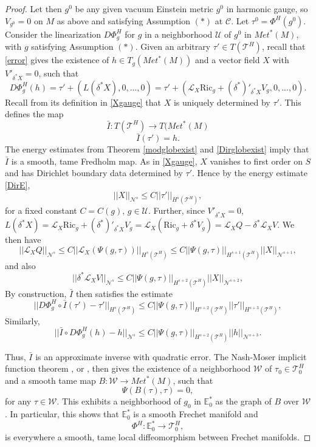 \documentclass[10pt]{amsart}
\renewcommand{\d}{\delta}
\newcommand{\cC}{{\mathcal C}}
\newcommand{\cT}{{\mathcal T}}
\newcommand{\cL}{{\mathcal L}}
\newcommand{\cU}{{\mathcal U}}
\newcommand{\cN}{{\mathcal N}}
\newcommand{\cW}{\mathcal W}
\newcommand{\bE}{\mathbb E}
\newcommand{\Ric}{\mathrm{Ric}}
\newcommand{\be}{\begin{equation}}
\newcommand{\ee}{\end{equation}}
\renewcommand{\to}{\rightarrow}
\newcommand{\<}{\langle}
\renewcommand{\>}{\rangle}
\theoremstyle{plain}
\theoremstyle{remark}
\theoremstyle{definition}
\numberwithin{equation}{section}
\begin{document}
\begin{proof}
    Let then $g^0$ be any given vacuum Einstein metric $g^0$ in harmonic gauge, so $V_{g^0} = 0$ on $M$ as above and satisfying Assumption $(*)$ at $\cC$. Let 
 $\tau^0 = \Phi^H(g^0)$. Consider the linearization $D\Phi_g^H$ for $g$ in a neighborhood $\cU$ of $g^0$ in $Met^*(M)$, with $g$ satisfying Assumption $(*)$. 
 Given an arbitrary $\tau' \in T(\cT^H)$, recall that \eqref{error} gives the existence of $h \in T_g(Met^*(M))$ and a vector field $X$ with $V'_{\d^*X} = 0$, such that 
\be\label{error2}
D\Phi_g^H(h) = \tau' +(L(\d^* X), 0,...,0) = \tau' +(\cL_X \Ric_g+(\d^*)'_{\d^* X}V_g, 0,...,0).
\ee
Recall from its definition in \eqref{Xgauge} that $X$ is uniquely determined by $\tau'$. This defines the map 
$$\bar I:T(\cT^H) \to T(Met^*(M)$$
$$\bar I(\tau') = h.$$
The energy estimates from Theorem \ref{modglobexist} and \ref{Dirglobexist} imply that $\bar I$ is a smooth, tame Fredholm map. As in \eqref{Xgauge}, 
$X$ vanishes to first order on $S$ and has Dirichlet boundary data determined by $\tau'$. Hence by the energy estimate \eqref{DirE},  
\be \label{Xbnd}
||X||_{\cN^s} \leq C ||\tau'||_{H^s(\cT^H)},
\ee
for a fixed constant $C = C(g)$, $g \in \cU$. Further, since $V'_{\d^*X} = 0$, $L(\d^*X) = \cL_X \Ric_g+(\d^*)'_{\d^* X}V_g = \cL_X(\Ric_g + \d^*V_g) = 
\cL_X Q - \d^*\cL_X V$. We then have  
$$||\cL_X Q||_{\cN^s} \leq C||\cL_X(\Psi(g, \tau))||_{H^s(\cT^H)} \leq C||\Psi(g, \tau)||_{H^{s+1}(\cT^H)} ||X||_{\cN^{s+1}},$$
and also
$$||\d^* \cL_X V||_{\cN^s}  \leq C||\Psi(g, \tau)||_{H^{s+2}(\cT^H)} ||X||_{\cN^{s+2}},$$
By construction, $\bar I$ then satisfies the estimate   
\be \label{quaderror}
||D\Phi_g^H\circ \bar I(\tau')-\tau'||_{H^s(\cT^H)} \leq C||\Psi(g, \tau)||_{H^{s+2}(\cT^H)} ||\tau'||_{H^{s+3}(\cT^H)},
\ee
Similarly, 
$$||\bar I \circ D\Phi_g^H(h) - h||_{\cN^s} \leq C||\Psi(g, \tau)||_{H^{s+2}(\cT^H)}  ||h||_{\cN^{s+3}}.$$
  
   Thus, $\bar I$ is an approximate inverse with quadratic error. The Nash-Moser implicit function theorem \cite[Thms.~3.3.1, 3.3.3]{Ham}, or \cite[Thm.~6.3.3]{Z2}, 
then gives the existence of a neighborhood $\cW$ of $\tau_0 \in \cT_0^H$ and a smooth tame map $B:  \cW \to Met^*(M)$, such that 
$$\Psi(B(\tau), \tau) = 0,$$
for any $\tau \in \cW$. This exhibits a neighborhood of $g_0$ in $\bE_0^*$ as the graph of $B$ over $\cW$. In particular, this shows that $\bE_0^*$ is a smooth
Frechet manifold and 
$$\Phi^H: \bE_0^* \to \cT_0^H,$$
is everywhere a smooth, tame local diffeomorphism between Frechet manifolds. 


\end{proof}
\end{document}
